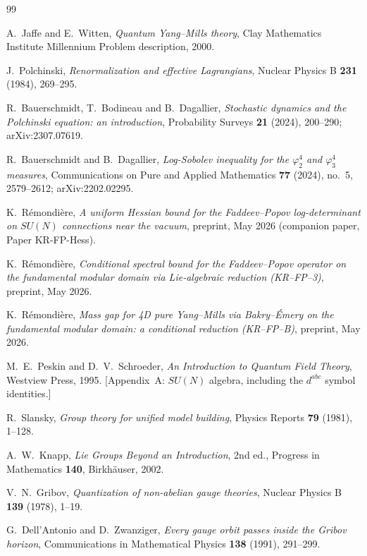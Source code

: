 \documentclass[11pt,a4paper]{amsart}
\theoremstyle{definition}
\begin{document}
\begin{thebibliography}{99}

A.~Jaffe and E.~Witten,
\emph{Quantum Yang--Mills theory},
Clay Mathematics Institute Millennium Problem description, 2000.

J.~Polchinski,
\emph{Renormalization and effective Lagrangians},
Nuclear Physics B \textbf{231} (1984), 269--295.

R.~Bauerschmidt, T.~Bodineau and B.~Dagallier,
\emph{Stochastic dynamics and the Polchinski equation: an introduction},
Probability Surveys \textbf{21} (2024), 200--290; arXiv:2307.07619.

R.~Bauerschmidt and B.~Dagallier,
\emph{Log-Sobolev inequality for the $\varphi^4_2$ and $\varphi^4_3$ measures},
Communications on Pure and Applied Mathematics \textbf{77} (2024), no.~5, 2579--2612;
arXiv:2202.02295.

K.~R\'emondi\`ere,
\emph{A uniform Hessian bound for the Faddeev--Popov log-determinant on
$SU(N)$ connections near the vacuum},
preprint, May 2026 (companion paper, Paper KR-FP-Hess).

K.~R\'emondi\`ere,
\emph{Conditional spectral bound for the Faddeev--Popov operator on the
fundamental modular domain via Lie-algebraic reduction (KR--FP--3)},
preprint, May 2026.

K.~R\'emondi\`ere,
\emph{Mass gap for 4D pure Yang--Mills via Bakry--\'Emery on the fundamental
modular domain: a conditional reduction (KR--FP--B)},
preprint, May 2026.

M.~E.~Peskin and D.~V.~Schroeder,
\emph{An Introduction to Quantum Field Theory},
Westview Press, 1995. [Appendix~A: $SU(N)$ algebra,
including the $d^{abc}$ symbol identities.]

R.~Slansky,
\emph{Group theory for unified model building},
Physics Reports \textbf{79} (1981), 1--128.

A.~W.~Knapp,
\emph{Lie Groups Beyond an Introduction},
2nd ed., Progress in Mathematics \textbf{140}, Birkh\"auser, 2002.

V.~N.~Gribov,
\emph{Quantization of non-abelian gauge theories},
Nuclear Physics B \textbf{139} (1978), 1--19.

G.~Dell'Antonio and D.~Zwanziger,
\emph{Every gauge orbit passes inside the Gribov horizon},
Communications in Mathematical Physics \textbf{138} (1991), 291--299.


\end{thebibliography}
\end{document}
